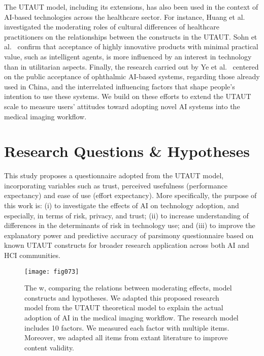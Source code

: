The UTAUT model, including its extensions, has also been used in the context of AI-based technologies across the healthcare sector.
For instance, Huang et al.~\cite{huang2010cultural} investigated the moderating roles of cultural differences of healthcare practitioners on the relationships between the constructs in the UTAUT.
Sohn et al.~\cite{SOHN2020101324} confirm that acceptance of highly innovative products with minimal practical value, such as intelligent agents, is more influenced by an interest in technology than in utilitarian aspects.
Finally, the research carried out by Ye et al.~\cite{info:doi/10.2196/14316} centered on the public acceptance of ophthalmic AI-based systems, regarding those already used in China, and the interrelated influencing factors that shape people’s intention to use these systems.
We build on these efforts to extend the UTAUT scale to measure users’ attitudes toward adopting novel AI systems into the medical imaging workflow.

\section{Research Questions \& Hypotheses}
\label{sec:chap004003}

This study proposes a questionnaire adopted from the UTAUT model, incorporating variables such as trust, perceived usefulness (performance expectancy) and ease of use (effort expectancy).
More specifically, the purpose of this work is: (i) to investigate the effects of AI on technology adoption, and especially, in terms of risk, privacy, and trust; (ii) to increase understanding of differences in the determinants of risk in technology use; and (iii) to improve the explanatory power and predictive accuracy of parsimony questionnaire based on known UTAUT constructs for broader research application across both AI and HCI communities.

\begin{figure*}
\centering
\texttt{[image: fig073]}
\caption{The w, comparing the relations between moderating effects, model constructs and hypotheses. We adapted this proposed research model from the UTAUT theoretical model to explain the actual adoption of AI in the medical imaging workflow. The research model includes 10 factors. We measured each factor with multiple items. Moreover, we adapted all items from extant literature to improve content validity.}
\label{fig:fig073}
\end{figure*}

